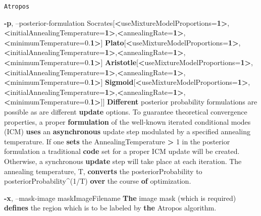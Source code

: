 \documentclass[ignorenonframetext,]{beamer}
\newenvironment{Shaded}{\begin{snugshade}}{\end{snugshade}}
\newcommand{\KeywordTok}[1]{\textcolor[rgb]{0.13,0.29,0.53}{\textbf{{#1}}}}
\newcommand{\NormalTok}[1]{{#1}}
\begin{document}
\begin{frame}[fragile]{\texttt{Atropos}}
\begin{Shaded}
\begin{Highlighting}[]
     \KeywordTok{-p}\NormalTok{, --posterior-formulation Socrates[}\KeywordTok{<}\NormalTok{useMixtureModelProportions=}\KeywordTok{1>}\NormalTok{,}\KeywordTok{<}\NormalTok{initialAnnealingTemperature=}\KeywordTok{1>}\NormalTok{,}\KeywordTok{<}\NormalTok{annealingRate=}\KeywordTok{1>}\NormalTok{,}\KeywordTok{<}\NormalTok{minimumTemperature=0.}\KeywordTok{1>}\NormalTok{]}
                                 \KeywordTok{Plato}\NormalTok{[}\KeywordTok{<}\NormalTok{useMixtureModelProportions=}\KeywordTok{1>}\NormalTok{,}\KeywordTok{<}\NormalTok{initialAnnealingTemperature=}\KeywordTok{1>}\NormalTok{,}\KeywordTok{<}\NormalTok{annealingRate=}\KeywordTok{1>}\NormalTok{,}\KeywordTok{<}\NormalTok{minimumTemperature=0.}\KeywordTok{1>}\NormalTok{]}
                                 \KeywordTok{Aristotle}\NormalTok{[}\KeywordTok{<}\NormalTok{useMixtureModelProportions=}\KeywordTok{1>}\NormalTok{,}\KeywordTok{<}\NormalTok{initialAnnealingTemperature=}\KeywordTok{1>}\NormalTok{,}\KeywordTok{<}\NormalTok{annealingRate=}\KeywordTok{1>}\NormalTok{,}\KeywordTok{<}\NormalTok{minimumTemperature=0.}\KeywordTok{1>}\NormalTok{]}
                                 \KeywordTok{Sigmoid}\NormalTok{[}\KeywordTok{<}\NormalTok{useMixtureModelProportions=}\KeywordTok{1>}\NormalTok{,}\KeywordTok{<}\NormalTok{initialAnnealingTemperature=}\KeywordTok{1>}\NormalTok{,}\KeywordTok{<}\NormalTok{annealingRate=}\KeywordTok{1>}\NormalTok{,}\KeywordTok{<}\NormalTok{minimumTemperature=0.}\KeywordTok{1>}\NormalTok{]]}
          \KeywordTok{Different} \NormalTok{posterior probability formulations are possible as are different}
          \KeywordTok{update} \NormalTok{options. To guarantee theoretical convergence properties, a proper}
          \KeywordTok{formulation} \NormalTok{of the well-known iterated conditional modes (ICM) }\KeywordTok{uses} \NormalTok{an}
          \KeywordTok{asynchronous} \NormalTok{update step modulated by a specified annealing temperature. If one}
          \KeywordTok{sets} \NormalTok{the AnnealingTemperature }\KeywordTok{>} \NormalTok{1 in the posterior formulation a traditional}
          \KeywordTok{code} \NormalTok{set for a proper ICM update will be created. Otherwise, a synchronous}
          \KeywordTok{update} \NormalTok{step will take place at each iteration. The annealing temperature, T,}
          \KeywordTok{converts} \NormalTok{the posteriorProbability to posteriorProbability^(1/T) }\KeywordTok{over} \NormalTok{the course}
          \KeywordTok{of} \NormalTok{optimization.}

     \KeywordTok{-x}\NormalTok{, --mask-image maskImageFilename}
          \KeywordTok{The} \NormalTok{image mask (which is required) }\KeywordTok{defines} \NormalTok{the region which is to be labeled by}
          \KeywordTok{the} \NormalTok{Atropos algorithm.}


\end{Highlighting}
\end{Shaded}
\end{frame}
\end{document}
